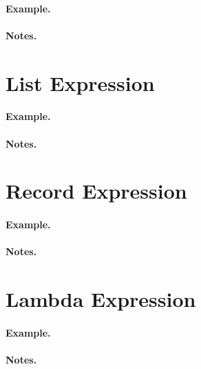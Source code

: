 \paragraph{Example.}

\paragraph{Notes.}


\section{List Expression}
\label{c_expr_list}

\begin{syntax}
\end{syntax}

\paragraph{Example.}

\paragraph{Notes.}


\section{Record Expression}
\label{c_expr_record}

\begin{syntax}
\end{syntax}

\paragraph{Example.}

\paragraph{Notes.}


\section{Lambda Expression}
\label{c_expr_lambda}

\begin{syntax}
\end{syntax}

\paragraph{Example.}

\paragraph{Notes.}

